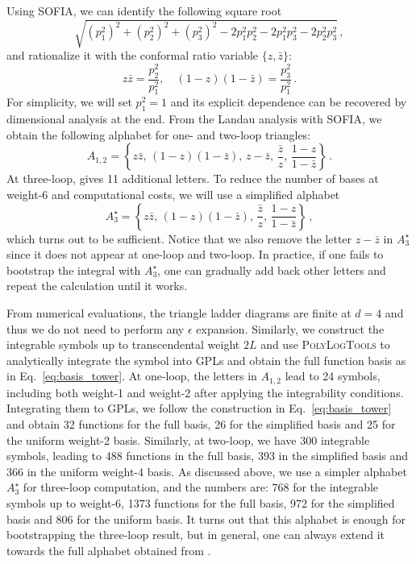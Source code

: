 \documentclass[a4paper,11pt]{article}
\begin{document}
Using \textsc{SOFIA}, we can identify the following square root
\begin{equation*}
    \sqrt{(p_1^2)^2+(p_2^2)^2+(p_3^2)^2-2p_1^2p_2^2-2p_1^2p_3^2-2p_2^2p_3^2}\,,
\end{equation*}
and rationalize it with the conformal ratio variable $\{z,\bar z\}$:
\begin{equation}
    z\bar z = \frac{p_2^2}{p_1^2},\quad (1-z)(1-\bar z) = \frac{p_3^2}{p_1^2}\,.
\end{equation}
For simplicity, we will set $p_1^2=1$ and its explicit dependence can be recovered by dimensional analysis at the end. From the Landau analysis with \textsc{SOFIA}, we obtain the following alphabet for one- and two-loop triangles:
\begin{equation}
    A_{1,2}=\left\{z\bar z,\, (1-z)(1-\bar z),\, z-\bar z,\, \frac{\bar z}{z},\, \frac{1-z}{1-\bar z} \right\}\,.
\end{equation}
At three-loop,  gives 11 additional letters. To reduce the number of bases at weight-6 and computational costs, we will use a simplified alphabet \begin{equation}
    A_{3}^\star =\left\{z\bar z,\, (1-z)(1-\bar z),\, \frac{\bar z}{z},\, \frac{1-z}{1-\bar z} \right\}\,,
\end{equation} 
which turns out to be sufficient. Notice that we also remove the letter $z-\bar z$ in $A_3^\star$ since it does not appear at one-loop and two-loop. In practice, if one fails to bootstrap the integral with $A_3^\star$, one can gradually add back other letters and repeat the calculation until it works. 

From numerical evaluations, the triangle ladder diagrams are finite at $d=4$ and thus we do not need to perform any $\epsilon$ expansion. Similarly, we construct the integrable symbols up to transcendental weight $2L$ and use \textsc{PolyLogTools} to analytically integrate the symbol into GPLs and obtain the full function basis as in Eq.~\eqref{eq:basis_tower}. At one-loop, the letters in $A_{1,2}$ lead to 24 symbols, including both weight-1 and weight-2 after applying the integrability conditions. Integrating them to GPLs, we follow the construction in Eq.~\eqref{eq:basis_tower} and obtain 32 functions for the full basis, 26 for the simplified basis and 25 for the uniform weight-2 basis. Similarly, at two-loop, we have 300 integrable symbols, leading to 488 functions in the full basis, 393 in the simplified basis and 366 in the uniform weight-4 basis. As discussed above, we use a simpler alphabet $A_3^\star$ for three-loop computation, and the numbers are: 768 for the integrable symbols up to weight-6, 1373 functions for the full basis, 972 for the simplified basis and 806 for the uniform basis. It turns out that this alphabet is enough for bootstrapping the three-loop result, but in general, one can always extend it towards the full alphabet obtained from .
\end{document}

